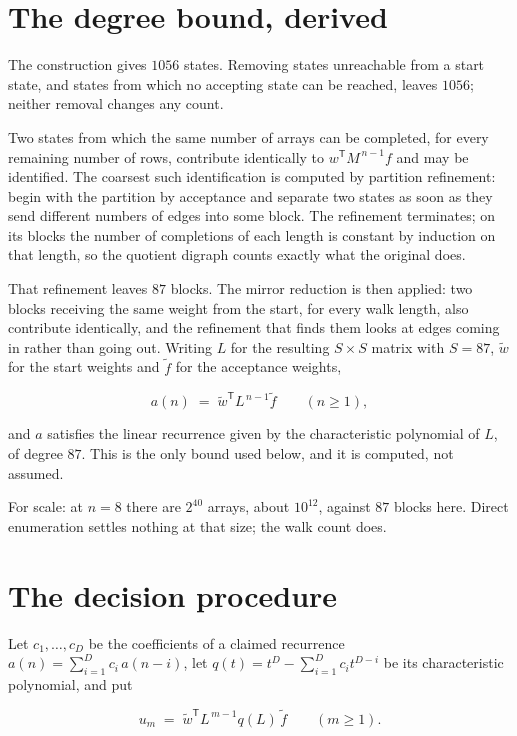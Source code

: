 \documentclass[11pt]{article}
\theoremstyle{definition}
\begin{document}
\section{The degree bound, derived}

The construction gives $1056$ states. Removing states unreachable from a start state, and states from which no accepting state can be reached, leaves $1056$; neither removal changes any count.

Two states from which the same number of arrays can be completed, for every remaining number of rows, contribute identically to $w^{\mathsf T}M^{\,n-1}f$ and may be identified. The coarsest such identification is computed by partition refinement: begin with the partition by acceptance and separate two states as soon as they send different numbers of edges into some block. The refinement terminates; on its blocks the number of completions of each length is constant by induction on that length, so the quotient digraph counts exactly what the original does.

That refinement leaves $87$ blocks. The mirror reduction is then applied: two blocks receiving the same weight from the start, for every walk length, also contribute identically, and the refinement that finds them looks at edges coming in rather than going out. Writing $L$ for the resulting $S \times S$ matrix with $S = 87$, $\tilde w$ for the start weights and $\tilde f$ for the acceptance weights,

\[a(n) \;=\; \tilde w^{\mathsf T} L^{\,n-1} \tilde f \qquad (n \ge 1),\]

and $a$ satisfies the linear recurrence given by the characteristic polynomial of $L$, of degree $87$. This is the only bound used below, and it is computed, not assumed.

For scale: at $n = 8$ there are $2^{40}$ arrays, about $10^{12}$, against $87$ blocks here. Direct enumeration settles nothing at that size; the walk count does.

\section{The decision procedure}

Let $c_1,\dots,c_D$ be the coefficients of a claimed recurrence $a(n) = \sum_{i=1}^{D} c_i\,a(n-i)$, let $q(t) = t^{D} - \sum_{i=1}^{D} c_i t^{D-i}$ be its characteristic polynomial, and put

\[u_m \;=\; \tilde w^{\mathsf T} L^{\,m-1} q(L)\,\tilde f \qquad (m \ge 1).\]
\end{document}
